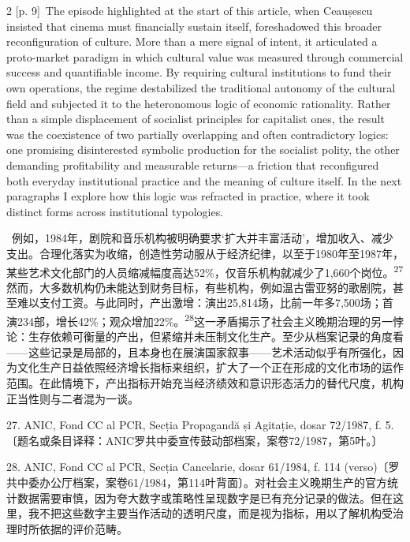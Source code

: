\documentclass[10pt,a4paper]{article}
\begin{document}
\begin{paracol}{2}
{\scriptsize\color{gray} [p. 9]}\ The episode highlighted at the start of this article, when Ceaușescu insisted that cinema must financially sustain itself, foreshadowed this broader reconfiguration of culture. More than a mere signal of intent, it articulated a proto-market paradigm in which cultural value was measured through commercial success and quantifiable income. By requiring cultural institutions to fund their own operations, the regime destabilized the traditional autonomy of the cultural field and subjected it to the heteronomous logic of economic rationality. Rather than a simple displacement of socialist principles for capitalist ones, the result was the coexistence of two partially overlapping and often contradictory logics: one promising disinterested symbolic production for the socialist polity, the other demanding profitability and measurable returns—a friction that reconfigured both everyday institutional practice and the meaning of culture itself. In the next paragraphs I explore how this logic was refracted in practice, where it took distinct forms across institutional typologies.\par
\switchcolumn*
{\scriptsize\color{gray} [p. 9]}\ 例如，1984年，剧院和音乐机构被明确要求‘扩大并丰富活动’，增加收入、减少支出。合理化落实为收缩，创造性劳动服从于经济纪律，以至于1980年至1987年，某些艺术文化部门的人员缩减幅度高达52\%，仅音乐机构就减少了1,660个岗\mbox{位。\textsuperscript{27}}然而，大多数机构仍未能达到财务目标，有些机构，例如温古雷亚努的歌剧院，甚至难以支付工资。与此同时，产出激增：演出25,814场，比前一年多7,500场；首演234部，增长42\%；观众增加22\%。\nobreak\textsuperscript{28}这一矛盾揭示了社会主义晚期治理的另一悖论：生存依赖可衡量的产出，但紧缩并未压制文化生产。至少从档案记录的角度看——这些记录是局部的，且本身也在展演国家叙事——艺术活动似乎有所强化，因为文化生产日益依照经济增长指标来组织，扩大了一个正在形成的文化市场的运作范围。在此情境下，产出指标开始充当经济绩效和意识形态活力的替代尺度，机构正当性则与二者混为一谈。\par{\small 27. ANIC, Fond CC al PCR, Secția Propagandă și Agitație, dosar 72/1987, f. 5. 〔题名或条目译释：ANIC罗共中委宣传鼓动部档案，案卷72/1987，第5叶。〕\par}{\small 28. ANIC, Fond CC al PCR, Secția Cancelarie, dosar 61/1984, f. 114 (verso)〔罗共中委办公厅档案，案卷61/1984，第114叶背面〕。对社会主义晚期生产的官方统计数据需要审慎，因为夸大数字或策略性呈现数字是已有充分记录的做法。但在这里，我不把这些数字主要当作活动的透明尺度，而是视为指标，用以了解机构受治理时所依据的评价范畴。\par}

\end{paracol}
\end{document}
